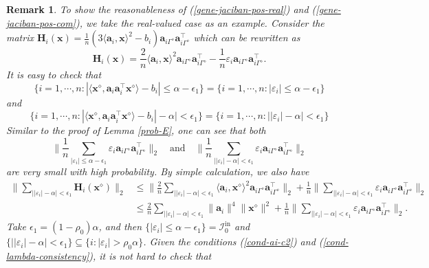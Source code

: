 \documentclass{article}
\newtheorem{remark}{Remark}
\numberwithin{equation}{section}
\begin{document}
\begin{remark}\label{r5}
	To show the reasonableness of (\ref{gene-jaciban-pos-real}) and (\ref{gene-jaciban-pos-com}), we take the real-valued case as an example. Consider the matrix
	$\mathbf{H}_i(\mathbf{x})=\frac{1}{n}(3\langle\mathbf{a}_i,\mathbf{x}\rangle^2-b_i)
	\mathbf{a}_{i\Gamma^\diamond}\mathbf{a}_{i\Gamma^\diamond}^\top$
	which can be rewritten as $$\mathbf{H}_i(\mathbf{x})=\frac{2}{n}\langle\mathbf{a}_i,\mathbf{x}\rangle^2
	\mathbf{a}_{i\Gamma^\diamond}\mathbf{a}_{i\Gamma^\diamond}^\top-
	\frac{1}{n}\varepsilon_i\mathbf{a}_{i\Gamma^\diamond}\mathbf{a}_{i\Gamma^\diamond}^\top.$$ It is easy to check that
		$$\{i=1,\cdots,n: |\langle\mathbf{x}^\diamond,\mathbf{a}_i\mathbf{a}_i^{\top}\mathbf{x}^\diamond\rangle-b_i|\leq\alpha-\epsilon_1\}=\{i=1,\cdots,n: |\varepsilon_i|\leq\alpha-\epsilon_1\}$$
		and 
		$$\{i=1,\cdots,n: |\langle\mathbf{x}^\diamond,\mathbf{a}_i\mathbf{a}_i^{\top}\mathbf{x}^\diamond\rangle-b_i|-\alpha\big|<\epsilon_1\}=\{i=1,\cdots,n: \big||\varepsilon_i|-\alpha\big|<\epsilon_1\}$$
		Similar to the proof of Lemma \ref{prob-E}, one can see that  both $$\|\frac{1}{n}\sum_{|\varepsilon_i|\leq\alpha-\epsilon_1}\varepsilon_i
	\mathbf{a}_{i\Gamma^\diamond}\mathbf{a}_{i\Gamma^\diamond}^\top\|_2
	\quad \mbox{and}\quad\|\frac{1}{n}\sum_{\big||\varepsilon_i|-\alpha\big|<\epsilon_1}\varepsilon_i
	\mathbf{a}_{i\Gamma^\diamond}\mathbf{a}_{i\Gamma^\diamond}^\top\|_2$$ are very small with high probability. By simple calculation, we also have 
	$$\begin{aligned}
		\|\sum_{\big||\varepsilon_i|-\alpha\big|<\epsilon_1}\mathbf{H}_i(\mathbf{x}^\diamond)\|_2
		&\leq \|\frac{2}{n}\sum_{\big||\varepsilon_i|-\alpha\big|<\epsilon_1}\langle\mathbf{a}_i,\mathbf{x}^\diamond\rangle^2
		\mathbf{a}_{i\Gamma^\diamond}\mathbf{a}_{i\Gamma^\diamond}^\top\|_2+
		\frac{1}{n}\|\sum_{\big||\varepsilon_i|-\alpha\big|<\epsilon_1}\varepsilon_i\mathbf{a}_{i\Gamma^\diamond}\mathbf{a}_{i\Gamma^\diamond}^\top\|_2\\
		&\leq\frac{2}{n}\sum_{\big||\varepsilon_i|-\alpha\big|<\epsilon_1}\|\mathbf{a}_i\|^4\|\mathbf{x}^\diamond\|^2
		+
		\frac{1}{n}\|\sum_{\big||\varepsilon_i|-\alpha\big|<\epsilon_1}\varepsilon_i\mathbf{a}_{i\Gamma^\diamond}\mathbf{a}_{i\Gamma^\diamond}^\top\|_2.
	\end{aligned}$$
	Take $\epsilon_1=(1-\rho_0)\alpha$, and then $\{|\varepsilon_i|\leq\alpha-\epsilon_1\}=\mathcal{I}_{0}^{\mathrm{in}} $ and $\{\big||\varepsilon_i|-\alpha\big|<\epsilon_1\}\subseteq
	\{i: |\varepsilon_i|>\rho_0\alpha\}$. Given the conditions (\ref{cond-ai-c2}) and (\ref{cond-lambda-consistency}), it is not hard to check that

\end{remark}
\end{document}
